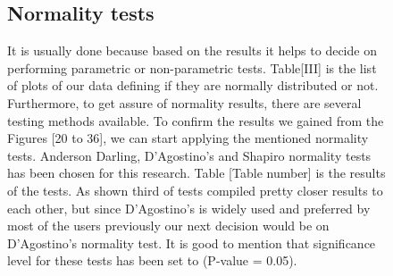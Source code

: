 \documentclass[letterpaper, 10 pt, conference]{ieeeconf}
\begin{document}
\begin{figure}[!ht]
\hfill
{}
\end{figure}


\begin{figure}[h!]
\subsection{Normality tests}
It is usually done because based on the results it helps to decide on performing parametric or non-parametric tests. Table[III] is the list of plots of our data defining if they are normally distributed or not.
Furthermore, to get assure of normality results, there are several testing methods available. To confirm the results we gained from the Figures [20 to 36], we can start applying the mentioned normality tests. Anderson Darling, D’Agostino’s and Shapiro normality tests has been chosen for this research. Table [Table number] is the results of the tests. As shown third of tests compiled pretty closer results to each other, but since D’Agostino’s is widely used and preferred by most of the users previously our next decision would be on D’Agostino’s normality test. It is good to mention that significance level for these tests has been set to (P-value = 0.05).
\end{figure}
\end{document}
